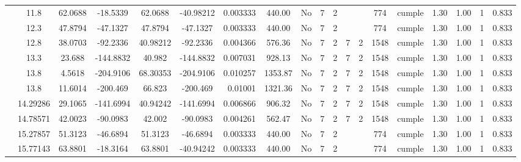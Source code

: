 \begin{table}[H]
{\begin{tabular}{|c|c|c|c|c|c|r|c|c|c|c|c|c|c|c|c|c|c|c|}
\cline{2-19}        & 11.8 & 62.0688 & -18.5339 & 62.0688 & -40.98212 & 0.003333 & 440.00 & No  & 7   & 2   &     &     & 774 & \cellcolor[rgb]{ .776,  .937,  .808}cumple & 1.30 & 1.00 & 1   & 0.833 \bigstrut\\
\cline{2-19}        & 12.3 & 47.8794 & -47.1327 & 47.8794 & -47.1327 & 0.003333 & 440.00 & No  & 7   & 2   &     &     & 774 & \cellcolor[rgb]{ .776,  .937,  .808}cumple & 1.30 & 1.00 & 1   & 0.833 \bigstrut\\
\cline{2-19}        & 12.8 & 38.0703 & -92.2336 & 40.98212 & -92.2336 & 0.004366 & 576.36 & No  & 7   & 2   & 7   & 2   & 1548 & \cellcolor[rgb]{ .776,  .937,  .808}cumple & 1.30 & 1.00 & 1   & 0.833 \bigstrut\\
\cline{2-19}        & 13.3 & 23.688 & -144.8832 & 40.982 & -144.8832 & 0.007031 & 928.13 & No  & 7   & 2   & 7   & 2   & 1548 & \cellcolor[rgb]{ .776,  .937,  .808}cumple & 1.30 & 1.00 & 1   & 0.833 \bigstrut\\
\cline{2-19}        & \cellcolor[rgb]{ .851,  .882,  .949}13.8 & 4.5618 & -204.9106 & 68.30353 & -204.9106 & 0.010257 & 1353.87 & No  & 7   & 2   & 7   & 2   & 1548 & \cellcolor[rgb]{ .776,  .937,  .808}cumple & 1.30 & 1.00 & 1   & 0.833 \bigstrut\\
\cline{2-19}        & \cellcolor[rgb]{ .851,  .882,  .949}13.8 & 11.6014 & -200.469 & 66.823 & -200.469 & 0.01001 & 1321.36 & No  & 7   & 2   & 7   & 2   & 1548 & \cellcolor[rgb]{ .776,  .937,  .808}cumple & 1.30 & 1.00 & 1   & 0.833 \bigstrut\\
\cline{2-19}        & 14.29286 & 29.1065 & -141.6994 & 40.94242 & -141.6994 & 0.006866 & 906.32 & No  & 7   & 2   & 7   & 2   & 1548 & \cellcolor[rgb]{ .776,  .937,  .808}cumple & 1.30 & 1.00 & 1   & 0.833 \bigstrut\\
\cline{2-19}        & 14.78571 & 42.0023 & -90.0983 & 42.002 & -90.0983 & 0.004261 & 562.47 & No  & 7   & 2   & 7   & 2   & 1548 & \cellcolor[rgb]{ .776,  .937,  .808}cumple & 1.30 & 1.00 & 1   & 0.833 \bigstrut\\
\cline{2-19}        & 15.27857 & 51.3123 & -46.6894 & 51.3123 & -46.6894 & 0.003333 & 440.00 & No  & 7   & 2   &     &     & 774 & \cellcolor[rgb]{ .776,  .937,  .808}cumple & 1.30 & 1.00 & 1   & 0.833 \bigstrut\\
\cline{2-19}        & 15.77143 & 63.8801 & -18.3164 & 63.8801 & -40.94242 & 0.003333 & 440.00 & No  & 7   & 2   &     &     & 774 & \cellcolor[rgb]{ .776,  .937,  .808}cumple & 1.30 & 1.00 & 1   & 0.833 \bigstrut\\

\end{tabular}}
\end{table}
